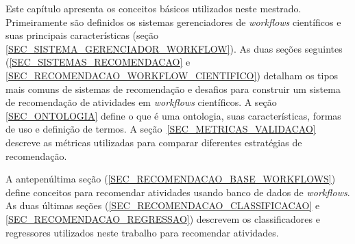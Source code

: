 %
%

Este capítulo apresenta os conceitos básicos utilizados neste mestrado. %
Primeiramente são definidos os sistemas gerenciadores de \emph{workf\mbox{}lows} científ\mbox{}icos e suas principais características (seção \ref{SEC_SISTEMA_GERENCIADOR_WORKFLOW}). As duas seções seguintes (\ref{SEC_SISTEMAS_RECOMENDACAO} e \ref{SEC_RECOMENDACAO_WORKFLOW_CIENTIFICO}) detalham os tipos mais comuns de sistemas de recomendação e desafios para construir um sistema de recomendação de atividades em \emph{workf\mbox{}lows} científ\mbox{}icos. A seção \ref{SEC_ONTOLOGIA} define o que é uma ontologia, suas características, formas de uso e definição de termos. A seção~\ref{SEC_METRICAS_VALIDACAO} descreve as métricas utilizadas para comparar diferentes estratégias de recomendação. 

A antepenúltima seção (\ref{SEC_RECOMENDACAO_BASE_WORKFLOWS}) define conceitos para recomendar atividades usando banco de dados de \emph{workf\mbox{}lows}. As duas últimas seções (\ref{SEC_RECOMENDACAO_CLASSIFICACAO} e \ref{SEC_RECOMENDACAO_REGRESSAO}) descrevem os classificadores e regressores utilizados neste trabalho para recomendar atividades.


